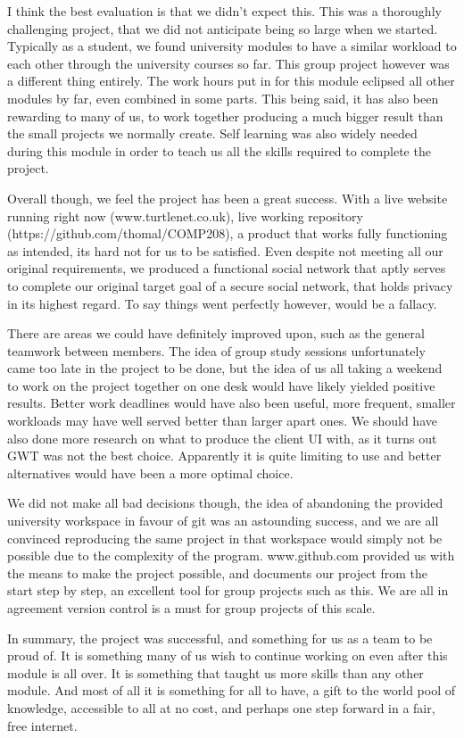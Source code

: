 I think the best evaluation is that we didn't expect this. This was a thoroughly 
challenging project, that we did not anticipate being so large when we started.
Typically as a student, we found university modules to have a similar workload to 
each other through the university courses so far. This group project however was 
a different thing entirely. The work hours put in for this module eclipsed all 
other modules by far, even combined in some parts. This being said, it has also 
been rewarding to many of us, to work together producing a much bigger result than
the small projects we normally create. Self learning was also widely needed during 
this module in order to teach us all the skills required to complete the project. 
\par

Overall though, we feel the project has been a great success. With a live website 
running right now (www.turtlenet.co.uk), live working repository 
(https://github.com/thomal/COMP208), a product that works fully functioning as 
intended, its hard not for us to be satisfied. Even despite not meeting all our 
original requirements, we produced a functional social network that aptly serves
to complete our original target goal of a secure social network, that holds privacy
in its highest regard. To say things went perfectly however, would be a fallacy.
\par

There are areas we could have definitely improved upon, such as the general 
teamwork between members. The idea of group study sessions unfortunately came too
late in the project to be done, but the idea of us all taking a weekend to work on
the project together on one desk would have likely yielded positive results. 
Better work deadlines would have also been useful, more frequent, smaller workloads 
may have well served better than larger apart ones. We should have also done more 
research on what to produce the client UI with, as it turns out GWT was not the 
best choice. Apparently it is quite limiting to use and better alternatives would 
have been a more optimal choice.
\par

We did not make all bad decisions though, the idea of abandoning the provided 
university workspace in favour of git was an astounding success, and we are all
convinced reproducing the same project in that workspace would simply not be 
possible due to the complexity of the program. www.github.com provided us with the 
means to make the project possible, and documents our project from the start 
step by step, an excellent tool for group projects such as this. We are all in 
agreement version control is a must for group projects of this scale.
\par

In summary, the project was successful, and something for us as a team to be 
proud of. It is something many of us wish to continue working on even after 
this module is all over. It is something that taught us more skills than any
other module. And most of all it is something for all to have, a gift to the 
world pool of knowledge, accessible to all at no cost, and perhaps one step 
forward in a fair, free internet.

